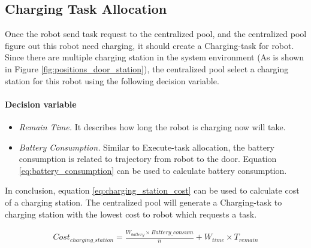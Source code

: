 \subsection{Charging Task Allocation}
Once the robot send task request to the centralized pool, and the centralized pool figure out this robot need charging, it should create a Charging-task for robot. Since there are multiple charging station in the system environment (As is shown in Figure \ref{fig:positions_door_station}), the centralized pool select a charging station for this robot using the following decision variable.

\paragraph*{Decision variable}

\begin{itemize}
	\item \textsl{Remain Time.} It describes how long the robot is charging now will take. 
	\item \textsl{Battery Consumption.} Similar to Execute-task allocation, the battery consumption is related to trajectory from robot to the door. Equation \ref{eq:battery_consumption} can be used to calculate battery consumption.
\end{itemize}
In conclusion, equation \ref{eq:charging_station_cost} can be used to calculate cost of a charging station. The centralized pool will generate a Charging-task to charging station with the lowest cost to robot which requests a task.

\begin{equation}
	\label{eq:charging_station_cost}
	\begin{split}
	Cost_{charging\_station} = \frac{W_{battery} \times Battery\_consum}{n} + W_{time} \times T_{remain}
	\end{split}
\end{equation}



